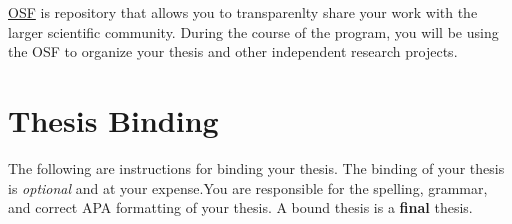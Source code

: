 \documentclass[openany]{book}
\begin{document}
\href{https://osf.io/}{OSF} is repository that allows you to transparenlty share your work with the larger scientific community. During the course of the program, you will be using the OSF to organize your thesis and other independent research projects.

\hypertarget{thesis-binding}{%
\chapter{Thesis Binding}\label{thesis-binding}}

The following are instructions for binding your thesis. The binding of your thesis is \emph{optional} and at your expense.You are responsible for the spelling, grammar, and correct APA formatting of your thesis. A bound thesis is a \textbf{final} thesis.
\end{document}
